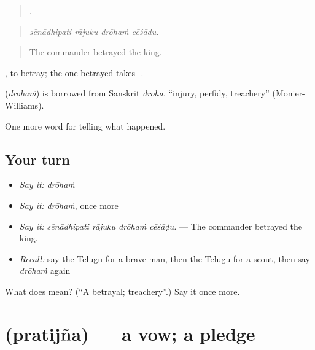 \begin{quote}
   .
\end{quote}

\begin{quote}
\emph{sēnādhipati rājuku drōhaṁ cēśāḍu.}
\end{quote}

\begin{quote}
The commander betrayed the king.
\end{quote}

 , to betray; the one betrayed takes -.

\begin{cousinweb}
\textbf{} (\emph{drōhaṁ}) is borrowed from Sanskrit \emph{droha}, \textquotedblleft{}injury, perfidy, treachery\textquotedblright{} (Monier-Williams).
\end{cousinweb}

\begin{grammarlens}[title={What you've built}]
One more word for telling what happened.
\end{grammarlens}

\subsection*{Your turn}
\begin{itemize}
\raggedright
  \item \emph{Say it:} \emph{drōhaṁ}
  \item \emph{Say it:} \emph{drōhaṁ}, once more
  \item \emph{Say it:} \emph{sēnādhipati rājuku drōhaṁ cēśāḍu.} — The commander betrayed the king.
  \item \emph{Recall:} say the Telugu for a brave man, then the Telugu for a scout, then say \emph{drōhaṁ} again
\end{itemize}

\begin{tcolorbox}[breakable,colback=teal!4,colframe=teal!35!black,title={Before you move on}]
What does  mean? (\textquotedblleft{}A betrayal; treachery\textquotedblright{}.) Say it once more.
\end{tcolorbox}
\section[\texorpdfstring{\te{ప్రతిజ్ఞ} (pratijña)}{ప్రతిజ్ఞ (pratijña)}]{ (pratijña) — a vow; a pledge}

